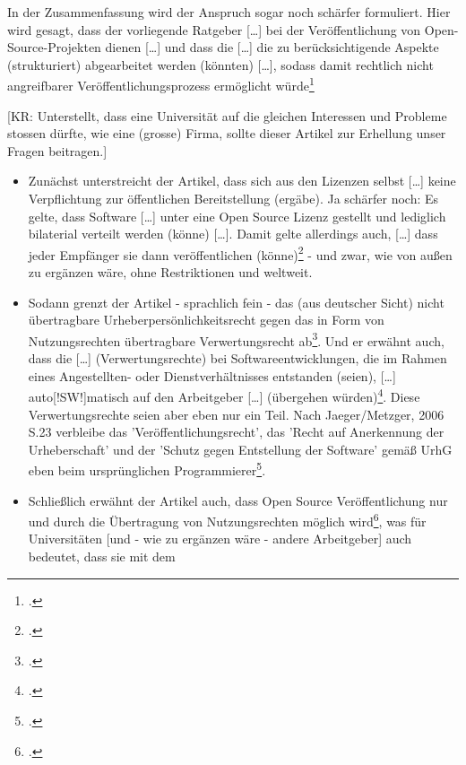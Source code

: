 \documentclass[DIV=calc,BCOR=5mm,11pt,headings=small,oneside,abstract=true, toc=bib]{scrartcl}
\begin{document}
In der Zusammenfassung wird der Anspruch sogar noch schärfer formuliert. Hier
wird gesagt, dass \glqq{}der vorliegende Ratgeber [\ldots] bei der
Veröffentlichung von Open-Source-Projekten dienen [\ldots]\grqq{} und dass die
\glqq{}[\ldots] die zu berücksichtigende Aspekte (strukturiert)
abgearbeitet werden (könnten) [\ldots]\grqq{}, sodass damit
\glqq{}rechtlich nicht angreifbarer Veröffentlichungsprozess\grqq{} ermöglicht
würde\footcite[vgl.][186]{BreGlaGra2008a}

 [KR: Unterstellt, dass eine Universität auf die gleichen Interessen
und Probleme stossen dürfte, wie eine (grosse) Firma, sollte dieser Artikel zur Erhellung
unser Fragen beitragen.]

\begin{itemize}
  \item Zunächst unterstreicht der Artikel, dass sich \glqq{}aus den Lizenzen
  selbst [\ldots] keine Verpflichtung zur öffentlichen Bereitstellung
  (ergäbe)\grqq{}. Ja schärfer noch: Es gelte, dass Software \glqq{}[\ldots]
  unter eine Open Source Lizenz gestellt und lediglich bilaterial verteilt
  werden (könne) [\ldots]\grqq{}. Damit gelte allerdings auch, \glqq{}[\ldots]
  dass jeder Empfänger sie dann veröffentlichen
  (könne)\grqq{}\footcite[vgl.][170]{BreGlaGra2008a} - und zwar, wie von außen
  zu ergänzen wäre, ohne Restriktionen und weltweit.
  \item Sodann grenzt der Artikel - sprachlich fein - das (aus deutscher Sicht)
  nicht übertragbare \glqq{}Urheberpersönlichkeitsrecht\grqq{} gegen das
  \glqq{}in Form von Nutzungsrechten übertragbare Verwertungsrecht\grqq{}
  ab\footcite[vgl.][173]{BreGlaGra2008a}. Und er erwähnt auch, dass die
  \glqq{}[\ldots] (Verwertungsrechte) bei Softwareentwicklungen, die im Rahmen
  eines Angestellten- oder Dienstverhältnisses entstanden (seien), [\ldots]
  auto[!SW!]matisch auf den Arbeitgeber [\ldots] (übergehen
  würden)\grqq{}\footcite[vgl.][173f]{BreGlaGra2008a}. Diese Verwertungsrechte
  seien aber eben nur ein Teil. Nach Jaeger/Metzger, 2006 S.23 verbleibe das
  'Veröffentlichungsrecht', das 'Recht auf Anerkennung der Urheberschaft' und
  der 'Schutz gegen Entstellung der Software' gemäß UrhG eben beim
  ursprünglichen Programmierer\footcite[vgl.][174]{BreGlaGra2008a}.
  \item Schließlich erwähnt der Artikel auch, dass Open Source Veröffentlichung
  nur und durch die Übertragung von Nutzungsrechten möglich
  wird\footcite[vgl.][175]{BreGlaGra2008a}, was für Universitäten [und -
  wie zu ergänzen wäre - andere Arbeitgeber] auch bedeutet, dass sie mit dem

\end{itemize}
\end{document}
